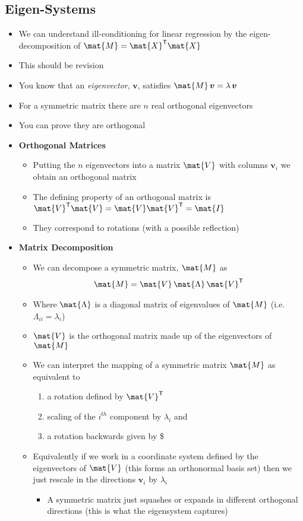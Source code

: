 \documentclass[11pt]{article}
\newcommand{\tr}{\textsf{T}}
\begin{document}
\subsection{Eigen-Systems}
\label{sec:orge3a4590}
\begin{itemize}
\item We can understand ill-conditioning for linear regression by the
eigen-decomposition of \(\mat{M}=\mat{X}^\tr \mat{X}\)
\item This should be revision
\item You know that an \emph{eigenvector}, \(\bm{v}\), satisfies \(\mat{M}\,\bm{v}=\lambda\,\bm{v}\)
\item For a symmetric matrix there are \(n\) real orthogonal eigenvectors
\item You can prove they are orthogonal
\item \textbf{Orthogonal Matrices}
\begin{itemize}
\item Putting the \(n\) eigenvectors into a matrix \(\mat{V}\) with
columns \(\bm{v}_i\) we obtain an orthogonal matrix
\item The defining property of an orthogonal matrix is
\(\mat{V}^\tr\mat{V} = \mat{V}\mat{V}^\tr=\mat{I}\)
\item They correspond to rotations (with a possible reflection)
\end{itemize}
\item \textbf{Matrix Decomposition}
\begin{itemize}
\item We can decompose a symmetric matrix, \(\mat{M}\) as
\begin{align*}
  \mat{M} = \mat{V}\,\mat{\Lambda}\,\mat{V}^\tr
\end{align*}
\item Where \(\mat{\Lambda}\) is a diagonal matrix of eigenvalues of \(\mat{M}\) 
(i.e. \(\Lambda_{ii}=\lambda_i\))
\item \(\mat{V}\) is the orthogonal matrix made up of the eigenvectors of \(\mat{M}\)
\item We can interpret the mapping of a symmetric matrix \(\mat{M}\) as
equivalent to
\begin{enumerate}
\item a rotation defined by \(\mat{V}^\tr\)
\item scaling of the \(i^{th}\) component by \(\lambda_i\) and
\item a rotation backwards given by \$
\end{enumerate}
\item Equivalently if we work in a coordinate system defined by the
eigenvectors of \(\mat{V}\) (this forms an orthonormal basis set)
then we just rescale in the directions \(\bm{v}_i\) by \(\lambda_i\)
\begin{itemize}
\item A symmetric matrix just squashes or expands in different
orthogonal directions (this is what  the eigensystem captures)
\end{itemize}
\end{itemize}


\end{itemize}
\end{document}
